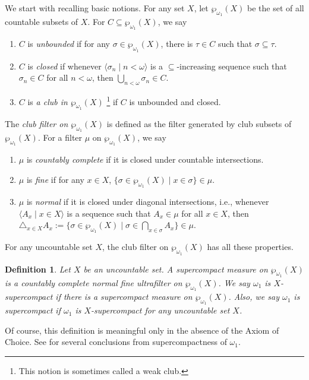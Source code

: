 \documentclass{amsart}
\newtheorem{dfn}{Definition}[section]
\renewcommand{\subset}{\subseteq}
\newcommand{\power}{\wp}
\begin{document}
We start with recalling basic notions.
For any set $X$, let $\power_{\omega_1}(X)$ be the set of all countable subsets of $X$.
For $C\subset\power_{\omega_1}(X)$, we say
\begin{enumerate}
    \item $C$ is \emph{unbounded} if for any $\sigma\in\power_{\omega_1}(X)$, there is $\tau\in C$ such that $\sigma\subset\tau$.
    \item $C$ is \emph{closed} if whenever $\langle\sigma_n\mid n<\omega\rangle$ is a $\subset$-increasing sequence such that $\sigma_n\in C$ for all $n<\omega$, then $\bigcup_{n<\omega}\sigma_n\in C$.
    \item $C$ is \emph{a club in $\power_{\omega_1}(X)$} \footnote{This notion is sometimes called a weak club.} if $C$ is unbounded and closed.
\end{enumerate}
The \emph{club filter on $\power_{\omega_1}(X)$} is defined as the filter generated by club subsets of $\power_{\omega_1}(X)$.
For a filter $\mu$ on $\power_{\omega_1}(X)$, we say
\begin{enumerate}
    \item $\mu$ is \emph{countably complete} if it is closed under countable intersections.
    \item $\mu$ is \emph{fine} if for any $x\in X$, $\{\sigma\in\power_{\omega_1}(X)\mid x\in\sigma\}\in\mu$.
    \item $\mu$ is \emph{normal} if it is closed under diagonal intersections, i.e., whenever $\langle A_x\mid x\in X\rangle$ is a sequence such that $A_x\in\mu$ for all $x\in X$, then $\triangle_{x\in X} A_x := \{\sigma\in\power_{\omega_1}(X)\mid\sigma\in\bigcap_{x\in\sigma}A_x\}\in\mu$.
\end{enumerate}
For any uncountable set $X$, the club filter on $\power_{\omega_1}(X)$ has all these properties.

\begin{dfn}
Let $X$ be an uncountable set.
A \emph{supercompact measure on $\power_{\omega_1}(X)$} is a countably complete normal fine ultrafilter on $\power_{\omega_1}(X)$.
We say \emph{$\omega_1$ is $X$-supercompact} if there is a supercompact measure on $\power_{\omega_1}(X)$.
Also, we say \emph{$\omega_1$ is supercompact} if $\omega_1$ is $X$-supercompact for any uncountable set $X$.
\end{dfn}

Of course, this definition is meaningful only in the absence of the Axiom of Choice.
See \cite{spct_of_omega_1} for several conclusions from supercompactness of $\omega_1$.
\end{document}
